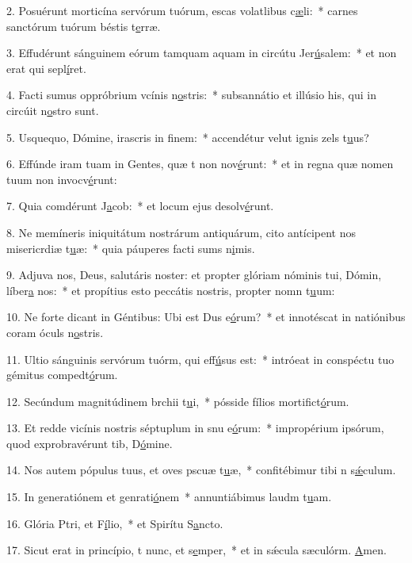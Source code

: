 2. Posuérunt morticína servórum tuórum, escas volatlibus c\uline{æ}li:~* carnes sanctórum tuórum béstis t\uline{e}rræ.\par 
3. Effudérunt sánguinem eórum tamquam aquam in circútu Jer\uline{ú}salem:~* et non erat qui sepl\uline{í}ret.\par 
4. Facti sumus oppróbrium vcínis n\uline{o}stris:~* subsannátio et illúsio his, qui in circúit n\uline{o}stro sunt.\par 
5. Usquequo, Dómine, irascris in f\uline{i}nem:~* accendétur velut ignis zels t\uline{u}us?\par 
6. Effúnde iram tuam in Gentes, quæ t non nov\uline{é}runt:~* et in regna quæ nomen tuum non invocv\uline{é}runt:\par 
7. Quia comdérunt J\uline{a}cob:~* et locum ejus desolv\uline{é}runt.\par 
8. Ne memíneris iniquitátum nostrárum antiquárum, cito antícipent nos misericrdiæ t\uline{u}æ:~* quia páuperes facti sums n\uline{i}mis.\par 
9. Adjuva nos, Deus, salutáris noster: et propter glóriam nóminis tui, Dómin, líber\uline{a} nos:~* et propítius esto peccátis nostris, propter nomn t\uline{u}um:\par 
10. Ne forte dicant in Géntibus: Ubi est Dus e\uline{ó}rum?~* et innotéscat in natiónibus coram óculs n\uline{o}stris.\par 
11. Ultio sánguinis servórum tuórm, qui eff\uline{ú}sus est:~* intróeat in conspéctu tuo gémitus compedt\uline{ó}rum.\par 
12. Secúndum magnitúdinem brchii t\uline{u}i,~* pósside fílios mortifict\uline{ó}rum.\par 
13. Et redde vicínis nostris séptuplum in snu e\uline{ó}rum:~* impropérium ipsórum, quod exprobravérunt tib, D\uline{ó}mine.\par 
14. Nos autem pópulus tuus, et oves pscuæ t\uline{u}æ,~* confitébimur tibi n s\uline{ǽ}culum.\par 
15. In generatiónem et genrati\uline{ó}nem~* annuntiábimus laudm t\uline{u}am.\par 
16. Glória Ptri, et F\uline{í}lio,~* et Spirítu S\uline{a}ncto.\par 
17. Sicut erat in princípio, t nunc, et s\uline{e}mper,~* et in sǽcula sæculórm. \uline{A}men.\par 
